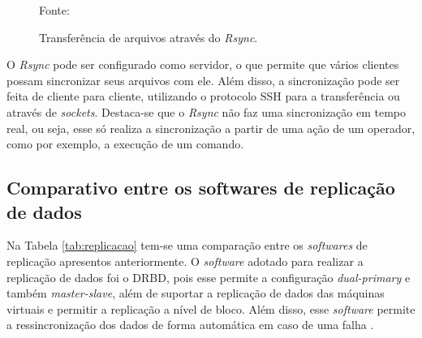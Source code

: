 \begin{figure}[h!]
 \centering
 \caption{Transferência de arquivos através do \textit{Rsync}.}
 Fonte: \citet{lopez2012}
 \label{fig:rsync}
\end{figure}


O \textit{Rsync} pode ser configurado como servidor, o que permite que vários clientes possam sincronizar seus arquivos com ele. 
Além disso, a sincronização pode ser feita de cliente para cliente, utilizando o protocolo \ac{SSH} para a transferência ou através de 
\textit{sockets}. Destaca-se que o \textit{Rsync} não faz uma sincronização em tempo real, ou seja, esse só realiza a sincronização a partir de 
uma ação de um operador, como por exemplo, a execução de um comando.


\newpage
\subsection{Comparativo entre os softwares de replicação de dados}
\label{section:replicacaoescolhido}

Na Tabela \ref{tab:replicacao} tem-se uma comparação entre os \textit{softwares} de replicação apresentos anteriormente. O \textit{software} 
adotado para realizar a replicação de dados foi o \ac{DRBD}, pois esse permite a configuração \textit{dual-primary} e também \textit{master-slave}, 
além de suportar a replicação de dados das máquinas virtuais e permitir a replicação a nível de bloco. Além disso, esse \textit{software} 
permite a ressincronização dos dados de forma automática em caso de uma falha \cite{drbd}.

